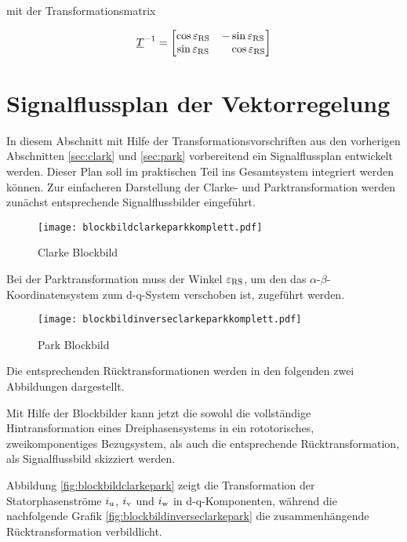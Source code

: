 mit der Transformationsmatrix

\begin{align}
	\underline{T}^{-1} =
	\begin{bmatrix}
		\cos{\varepsilon_{\mathrm{RS}}} & -\sin{\varepsilon_{\mathrm{RS}}} \\
		\sin{\varepsilon_{\mathrm{RS}}} & ~~~\cos{\varepsilon_{\mathrm{RS}}}
	\end{bmatrix}
	\label{parkmatrixinvers}
\end{align}



\section{Signalflussplan der Vektorregelung}\label{sec:signalflussplan}

In diesem Abschnitt mit Hilfe der Transformationsvorschriften aus den vorherigen Abschnitten \ref{sec:clark} und \ref{sec:park} vorbereitend ein Signalflussplan entwickelt werden.
Dieser Plan soll im praktischen Teil ins Gesamtsystem integriert werden können.
Zur einfacheren Darstellung der Clarke- und Parktransformation werden zunächst entsprechende Signalflussbilder eingeführt.

\begin{figure}[h]
	\centering
	\texttt{[image: blockbildclarkeparkkomplett.pdf]}
	\label{fig:clarkeparkkomplett}
	\caption{Clarke Blockbild}
\end{figure}

Bei der Parktransformation muss der Winkel $\varepsilon_{\mathrm{RS}}$, um den das $\alpha$-$\beta$-Koordinatensystem zum d-q-System verschoben ist, zugeführt werden.

\begin{figure}[h]
	\centering
	\texttt{[image: blockbildinverseclarkeparkkomplett.pdf]}
	\label{fig:blockbildpark}
	\caption{Park Blockbild}
\end{figure}

Die entsprechenden Rücktransformationen werden in den folgenden zwei Abbildungen dargestellt.




Mit Hilfe der Blockbilder kann jetzt die sowohl die vollständige Hintransformation eines Dreiphasensystems in ein rototorisches, zweikomponentiges Bezugsystem, als auch die entsprechende Rücktransformation, als Signalflussbild skizziert werden.



Abbildung \ref{fig:blockbildclarkepark} zeigt die Transformation der Statorphasenströme $i_{\mathrm{u}}$, $i_{\mathrm{v}}$ und $i_{\mathrm{w}}$ in d-q-Komponenten, während die nachfolgende Grafik \ref{fig:blockbildinverseclarkepark} die zusammenhängende Rücktransformation verbildlicht.




 
